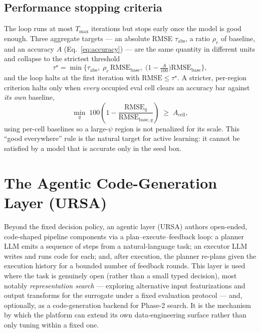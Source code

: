 \documentclass[11pt]{article}
\newcommand{\rmse}{\mathrm{RMSE}}
\begin{document}
\subsection{Performance stopping criteria}
\label{sec:stopping}

The loop runs at most $T_{\max}$ iterations but stops early once the model is
good enough. Three aggregate targets --- an absolute RMSE $\tau_{\mathrm{abs}}$,
a ratio $\rho_r$ of baseline, and an accuracy $A$ (Eq.~\eqref{eq:accuracy}) ---
are the same quantity in different units and collapse to the strictest
threshold
\begin{equation}
  \tau^\star = \min\Big\{\tau_{\mathrm{abs}},\;
  \rho_r\,\rmse_{\mathrm{base}},\;
  \big(1-\tfrac{A}{100}\big)\rmse_{\mathrm{base}}\Big\},
\end{equation}
and the loop halts at the first iteration with $\rmse \le \tau^\star$. A
stricter, per-region criterion halts only when \emph{every} occupied eval cell
clears an accuracy bar against \emph{its own} baseline,
\begin{equation}
  \min_{q}\;100\left(1-\frac{\rmse_q}{\rmse_{\mathrm{base},q}}\right)
  \;\ge\; A_{\mathrm{cell}} ,
\end{equation}
using per-cell baselines so a large-$\psi$ region is not penalized for its
scale. This ``good everywhere'' rule is the natural target for active learning:
it cannot be satisfied by a model that is accurate only in the seed box.

\section{The Agentic Code-Generation Layer (URSA)}
\label{sec:ursa}

Beyond the fixed decision policy, an agentic layer (URSA) authors open-ended,
code-shaped pipeline components via a plan--execute--feedback loop: a planner
LLM emits a sequence of steps from a natural-language task; an executor LLM
writes and runs code for each; and, after execution, the planner re-plans given
the execution history for a bounded number of feedback rounds. This layer is
used where the task is genuinely open (rather than a small typed decision), most
notably \emph{representation search} --- exploring alternative input
featurizations and output transforms for the surrogate under a fixed evaluation
protocol --- and, optionally, as a code-generation backend for Phase-2 search.
It is the mechanism by which the platform can extend its own data-engineering
surface rather than only tuning within a fixed one.
\end{document}
